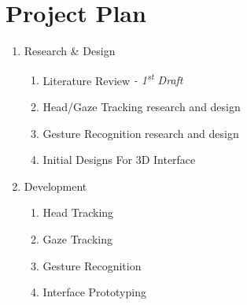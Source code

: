 \section{Project Plan}



\begin{notes}
    \begin{enumerate}
        \item \label{itm:research} Research \& Design
            \begin{enumerate}
                \item \label{itm:lit_review_draft} Literature Review \textit{- 1\textsuperscript{st} Draft}
                \item \label{itm:tracking_design} Head/Gaze Tracking research and design 
                \item \label{itm:gesture_design} Gesture Recognition research and design 
                \item \label{itm:interface_design} Initial Designs For 3D Interface
            \end{enumerate} 
        \item \label{itm:development} Development
            \begin{enumerate}
                \item \label{itm:head_tracking} Head Tracking
                \item \label{itm:gaze_tracking} Gaze Tracking
                \item \label{itm:gesture_recognition} Gesture Recognition
                \item \label{itm:interface} Interface Prototyping
            \end{enumerate}

\end{enumerate}
\end{notes}
